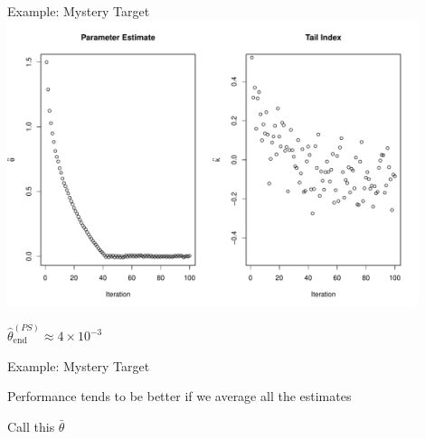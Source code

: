 \documentclass[14pt]{beamer}
\begin{document}
\begin{frame}{Example: Mystery Target}
    \centering
    \includegraphics[height=0.7\textheight, width=0.9\textwidth, keepaspectratio]{Figures/PS traj.pdf} \newline
    \begin{outline}
        $\hat{\theta}_\mathrm{end}^{(PS)} \approx 4 \times 10^{-3}$ \hspace{5cm}
    \end{outline}
\end{frame}

\begin{frame}{Example: Mystery Target}
    \begin{outline}
        \1 Performance tends to be better if we average all the estimates \newline

        \1 Call this $\bar{\theta}$
    \end{outline}
\end{frame}
\end{document}
